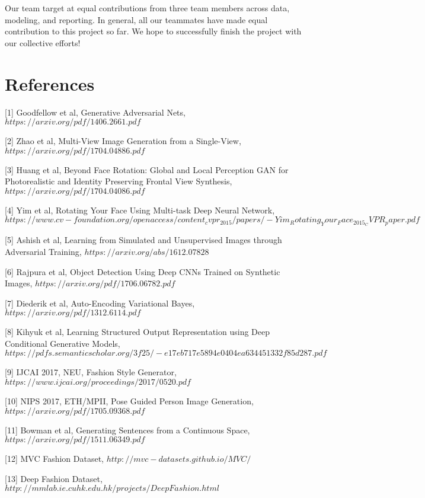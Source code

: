 \documentclass[10pt,conference]{IEEEtran}
\begin{document}
Our team target at equal contributions from three team members across data, modeling, and reporting.  In general, all our teammates have made equal contribution to this project so far. We hope to successfully finish the project with our collective efforts!

\section{References}

[1] Goodfellow et al, Generative Adversarial Nets, $https://arxiv.org/pdf/1406.2661.pdf$ 

[2] Zhao et al, Multi-View Image Generation from a Single-View, $https://arxiv.org/pdf/1704.04886.pdf$

[3] Huang et al, Beyond Face Rotation: Global and Local Perception GAN for Photorealistic and Identity Preserving Frontal View Synthesis, $https://arxiv.org/pdf/1704.04086.pdf$ 

[4] Yim et al, Rotating Your Face Using Multi-task Deep Neural Network, $https://www.cv-foundation.org/openaccess/content_cvpr_2015/papers/-Yim_Rotating_Your_Face_2015_CVPR_paper.pdf$

[5] Ashish et al, Learning from Simulated and Unsupervised Images through Adversarial Training, $https://arxiv.org/abs/1612.07828$

[6] Rajpura et al, Object Detection Using Deep CNNs Trained on Synthetic Images, $https://arxiv.org/pdf/1706.06782.pdf$

[7] Diederik et al, Auto-Encoding Variational Bayes, $https://arxiv.org/pdf/1312.6114.pdf$

[8] Kihyuk et al, Learning Structured Output Representation using Deep Conditional Generative Models, $https://pdfs.semanticscholar.org/3f25/-e17eb717e5894e0404ea634451332f85d287.pdf$

[9] IJCAI 2017, NEU, Fashion Style Generator, $https://www.ijcai.org/proceedings/2017/0520.pdf$

[10] NIPS 2017, ETH/MPII, Pose Guided Person Image Generation, $https://arxiv.org/pdf/1705.09368.pdf$

[11] Bowman et al, Generating Sentences from a Continuous Space, $https://arxiv.org/pdf/1511.06349.pdf$

[12] MVC Fashion Dataset, $http://mvc-datasets.github.io/MVC/$

[13] Deep Fashion Dataset, $http://mmlab.ie.cuhk.edu.hk/projects/DeepFashion.html$
\end{document}
